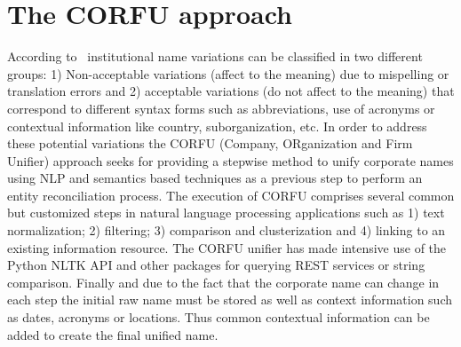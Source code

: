 \documentclass{llncs}
\begin{document}
 \section{The CORFU approach}
According to~\cite{Galvez2006,Morillo:2013:TAA:2424697.2424727} institutional name variations can be 
classified in two different groups: 1) Non-acceptable variations (affect to the meaning) due to mispelling or translation errors and 
2) acceptable variations (do not affect to the meaning) that correspond to different syntax forms such as abbreviations, use of acronyms or contextual 
information like country, suborganization, etc. In order to address these potential variations the CORFU (Company, ORganization and Firm Unifier) approach 
seeks for providing a stepwise method to unify corporate names using NLP and semantics based techniques as a previous step to perform 
an entity reconciliation process. The execution of CORFU comprises several common but customized steps in natural language processing applications such as 
1) text normalization; 2) filtering; 3) comparison and clusterization and 4) linking to an existing information resource. The CORFU unifier 
has made intensive use of the Python NLTK API and other packages for querying REST services or string comparison. Finally and 
due to the fact that the corporate name can change in each step the initial raw name must be stored as well as context information such as dates, acronyms or locations. 
Thus common contextual information can be added to create the final unified name.
\end{document}
